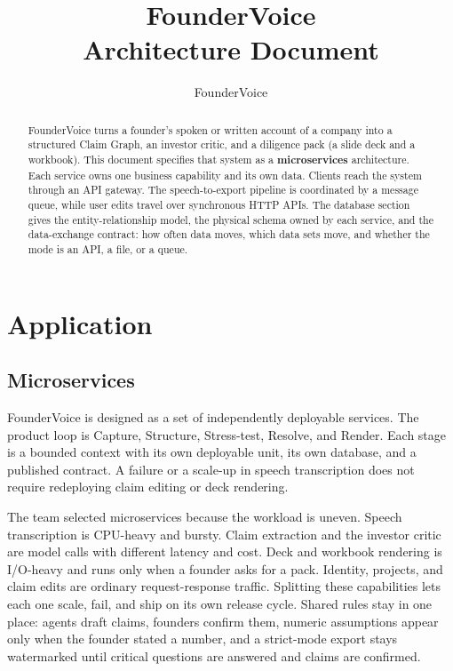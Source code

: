 \documentclass[11pt,a4paper]{article}
\title{\textbf{FounderVoice}\\[0.4em]
\large Architecture Document}
\author{FounderVoice}
\date{}
\begin{document}
\maketitle
\thispagestyle{empty}

\begin{abstract}
\noindent
FounderVoice turns a founder's spoken or written account of a company into a structured Claim Graph, an investor critic, and a diligence pack (a slide deck and a workbook). This document specifies that system as a \textbf{microservices} architecture. Each service owns one business capability and its own data. Clients reach the system through an API gateway. The speech-to-export pipeline is coordinated by a message queue, while user edits travel over synchronous HTTP APIs. The database section gives the entity-relationship model, the physical schema owned by each service, and the data-exchange contract: how often data moves, which data sets move, and whether the mode is an API, a file, or a queue.
\end{abstract}

\tableofcontents
\newpage

\section{Application}

\subsection{Microservices}

FounderVoice is designed as a set of independently deployable services. The product loop is Capture, Structure, Stress-test, Resolve, and Render. Each stage is a bounded context with its own deployable unit, its own database, and a published contract. A failure or a scale-up in speech transcription does not require redeploying claim editing or deck rendering.

The team selected microservices because the workload is uneven. Speech transcription is CPU-heavy and bursty. Claim extraction and the investor critic are model calls with different latency and cost. Deck and workbook rendering is I/O-heavy and runs only when a founder asks for a pack. Identity, projects, and claim edits are ordinary request-response traffic. Splitting these capabilities lets each one scale, fail, and ship on its own release cycle. Shared rules stay in one place: agents draft claims, founders confirm them, numeric assumptions appear only when the founder stated a number, and a strict-mode export stays watermarked until critical questions are answered and claims are confirmed.
\end{document}
